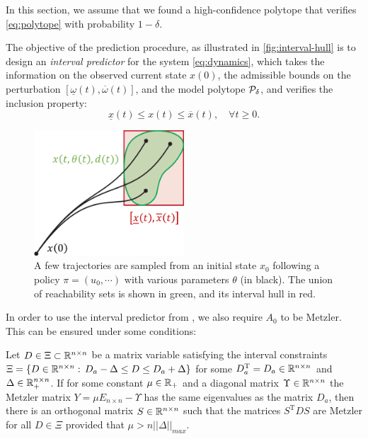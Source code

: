 \documentclass{article}
\begin{document}
In this section, we assume that we found a high-confidence polytope that verifies \eqref{eq:polytope} with probability $1-\delta$.

The objective of the prediction procedure, as illustrated in \autoref{fig:interval-hull} is to design an \emph{interval predictor} for the system \eqref{eq:dynamics}, which takes the information on the observed current state ${x}({0})$, the admissible bounds on the perturbation $[\underline{\omega}(t),\overline{\omega}(t)]$, and the model polytope $\mathcal{P}_\delta$, and verifies the inclusion property:
\begin{equation}
\label{eq:interval_property}
\underline{x}(t)\leq x(t)\leq\overline{x}(t),\quad\forall t\geq0.
\end{equation}

\begin{figure}
    \centering
    \includegraphics[width=0.5\textwidth]{img/interval-hull}
    \caption{A few trajectories are sampled from an initial state $x_0$ following a policy $\pi=(u_0,\cdots)$ with various parameters $\theta$ (in black). The union of reachability sets is shown in green, and its interval hull in red.}
    \label{fig:interval-hull}
\end{figure}

In order to use the interval predictor from \citep{leurent2019interval}, we also require $A_0$ to be Metzler. This can be ensured under some conditions:

\begin{lemma}
\label{lem:metzler} Let $D\in\Xi\subset\mathbb{R}^{n\times n}$ be a matrix variable satisfying the interval constraints $\Xi=\{D\in\mathbb{R}^{n\times n}:\,D_{a}-\Delta\le D\le D_{a}+\Delta\}$ for some $D_{a}^{\text{T}}=D_{a}\in\mathbb{R}^{n\times n}$ and $\Delta\in\mathbb{R}_{+}^{n\times n}$. If for some constant $\mu\in\mathbb{R}_{+}$ and a diagonal matrix $\Upsilon\in\mathbb{R}^{n\times n}$ the Metzler matrix $Y=\mu E_{n\times n}-\Upsilon$ has the same eigenvalues as the matrix $D_{a}$, then there is an orthogonal matrix $S\in\mathbb{R}^{n\times n}$ such that the matrices $S^{\text{T}}DS$ are Metzler for all $D\in\Xi$ provided that $\mu>n||\Delta||_{max}$.\textup{ }
\end{lemma}
\end{document}
